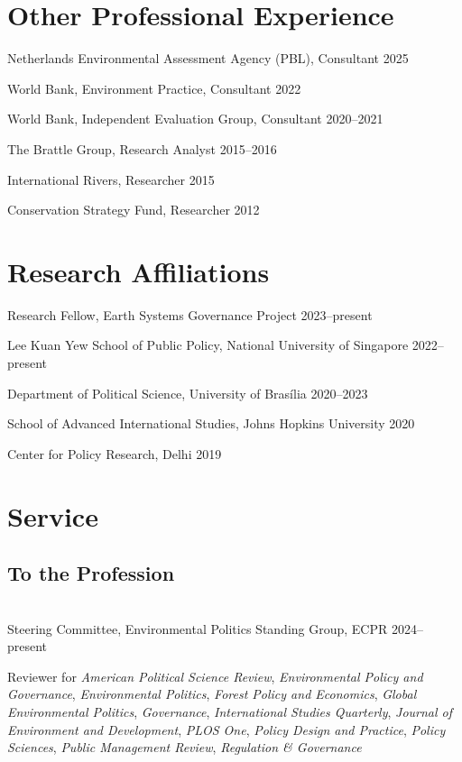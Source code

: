 \documentclass[11pt, letterpaper]{article}
\newcommand{\cventry}[2]{\noindent #1 \hfill #2\par}
\begin{document}
\section{Other Professional Experience}

\cventry{Netherlands Environmental Assessment Agency (PBL), Consultant}{2025}
\cventry{World Bank, Environment Practice, Consultant}{2022}
\cventry{World Bank, Independent Evaluation Group, Consultant}{2020--2021}
\cventry{The Brattle Group, Research Analyst}{2015--2016}
\cventry{International Rivers, Researcher}{2015}
\cventry{Conservation Strategy Fund, Researcher}{2012}

\section{Research Affiliations}

\cventry{Research Fellow, Earth Systems Governance Project}{2023--present}
\cventry{Lee Kuan Yew School of Public Policy, National University of Singapore}{2022--present}
\cventry{Department of Political Science, University of Bras\'ilia}{2020--2023}
\cventry{School of Advanced International Studies, Johns Hopkins University}{2020}
\cventry{Center for Policy Research, Delhi}{2019}

\section{Service}

\subsection{To the Profession} \hfill \\
\cventry{Steering Committee, Environmental Politics Standing Group, ECPR}{2024--present}
Reviewer for \textit{American Political Science Review}, \textit{Environmental Policy and Governance}, \textit{Environmental Politics}, \textit{Forest Policy and Economics}, \textit{Global Environmental Politics}, \textit{Governance}, \textit{International Studies Quarterly}, \textit{Journal of Environment and Development}, \textit{PLOS One}, \textit{Policy Design and Practice}, \textit{Policy Sciences}, \textit{Public Management Review}, \textit{Regulation \& Governance}
\end{document}
